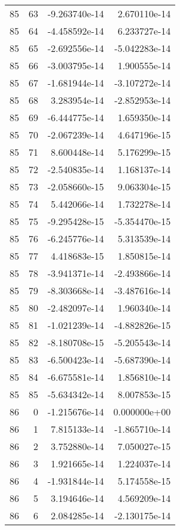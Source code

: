 \begin{tabular}{rrrr}
  85 &   63 & -9.263740e-14 &  2.670110e-14 \\
  85 &   64 & -4.458592e-14 &  6.233727e-14 \\
  85 &   65 & -2.692556e-14 & -5.042283e-14 \\
  85 &   66 & -3.003795e-14 &  1.900555e-14 \\
  85 &   67 & -1.681944e-14 & -3.107272e-14 \\
  85 &   68 &  3.283954e-14 & -2.852953e-14 \\
  85 &   69 & -6.444775e-14 &  1.659350e-14 \\
  85 &   70 & -2.067239e-14 &  4.647196e-15 \\
  85 &   71 &  8.600448e-14 &  5.176299e-15 \\
  85 &   72 & -2.540835e-14 &  1.168137e-14 \\
  85 &   73 & -2.058660e-15 &  9.063304e-15 \\
  85 &   74 &  5.442066e-14 &  1.732278e-14 \\
  85 &   75 & -9.295428e-15 & -5.354470e-15 \\
  85 &   76 & -6.245776e-14 &  5.313539e-14 \\
  85 &   77 &  4.418683e-15 &  1.850815e-14 \\
  85 &   78 & -3.941371e-14 & -2.493866e-14 \\
  85 &   79 & -8.303668e-14 & -3.487616e-14 \\
  85 &   80 & -2.482097e-14 &  1.960340e-14 \\
  85 &   81 & -1.021239e-14 & -4.882826e-15 \\
  85 &   82 & -8.180708e-15 & -5.205543e-14 \\
  85 &   83 & -6.500423e-14 & -5.687390e-14 \\
  85 &   84 & -6.675581e-14 &  1.856810e-14 \\
  85 &   85 & -5.634342e-14 &  8.007853e-15 \\
  86 &    0 & -1.215676e-14 &  0.000000e+00 \\
  86 &    1 &  7.815133e-14 & -1.865710e-14 \\
  86 &    2 &  3.752880e-14 &  7.050027e-15 \\
  86 &    3 &  1.921665e-14 &  1.224037e-14 \\
  86 &    4 & -1.931844e-14 &  5.174558e-15 \\
  86 &    5 &  3.194646e-14 &  4.569209e-14 \\
  86 &    6 &  2.084285e-14 & -2.130175e-14 \\

\end{tabular}

